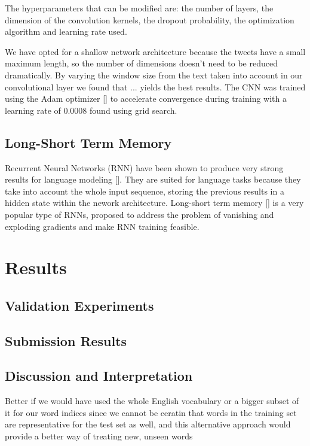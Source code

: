 \documentclass[11pt,a4paper]{article}
\begin{document}
The hyperparameters that can be modified are: the number of layers, the dimension of the convolution kernels, the dropout probability, the optimization algorithm and learning rate used.

We have opted for a shallow network architecture because the tweets have a small maximum length, so the number of dimensions doesn't need to be reduced dramatically. By varying the window size from the text taken into account in our convolutional layer we found that ... yields the best results. The CNN was trained using the Adam optimizer [] to accelerate convergence during training with a learning rate of 0.0008 found using grid search.

\subsection{Long-Short Term Memory}

Recurrent Neural Networks (RNN) have been shown to produce very strong results for language modeling []. 
They are suited for language tasks because they take into account the whole input sequence, storing the previous results in a hidden state within the nework architecture. Long-short term memory [] is a very popular type of RNNs, proposed to address the problem of vanishing and exploding gradients and make RNN training feasible.

\section{Results}

\subsection{Validation Experiments}

\subsection{Submission Results}

\subsection{Discussion and Interpretation}

Better if we would have used the whole English vocabulary or a bigger subset of it for our word indices since we cannot be ceratin that words in the training set are representative for the test set as well, and this alternative approach would provide a better way of treating new, unseen words
\end{document}
